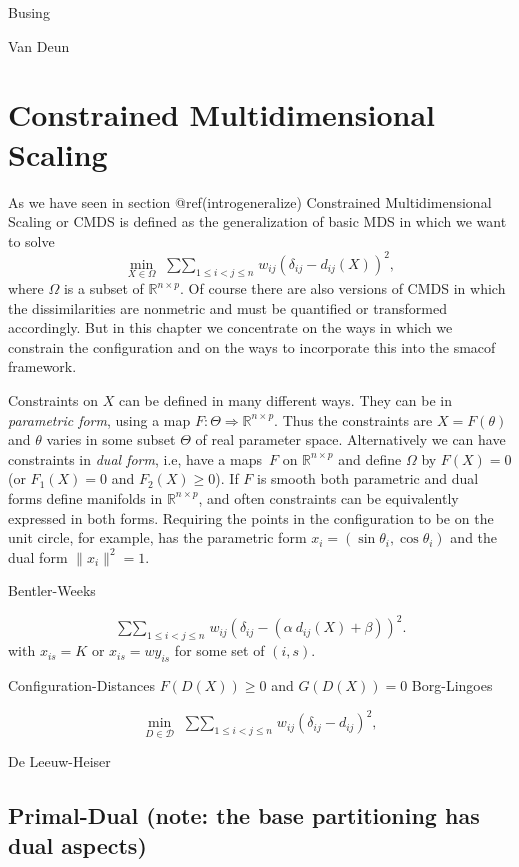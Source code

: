 \documentclass[
  12pt,
  letterpaper,
  DIV=11,
  numbers=noendperiod]{scrreprt}
\theoremstyle{remark}
\begin{document}
Busing

Van Deun


\chapter{Constrained Multidimensional Scaling}\label{cmds}

As we have seen in section @ref(introgeneralize) Constrained
Multidimensional Scaling or CMDS is defined as the generalization of
basic MDS in which we want to solve \[
\min_{X\in\Omega}\ \mathop{\sum\sum}_{1\leq i<j\leq n}w_{ij}(\delta_{ij}-d_{ij}(X))^2,
\] where \(\Omega\) is a subset of \(\mathbb{R}^{n\times p}\). Of course
there are also versions of CMDS in which the dissimilarities are
nonmetric and must be quantified or transformed accordingly. But in this
chapter we concentrate on the ways in which we constrain the
configuration and on the ways to incorporate this into the smacof
framework.

Constraints on \(X\) can be defined in many different ways. They can be
in \emph{parametric form}, using a map
\(F:\Theta\Rightarrow\mathbb{R}^{n\times p}\). Thus the constraints are
\(X=F(\theta)\) and \(\theta\) varies in some subset \(\Theta\) of real
parameter space. Alternatively we can have constraints in \emph{dual
form}, i.e, have a maps~\(F\) on \(\mathbb{R}^{n\times p}\) and define
\(\Omega\) by \(F(X)=0\) (or \(F_1(X)=0\) and \(F_2(X)\geq 0\)). If
\(F\) is smooth both parametric and dual forms define manifolds in
\(\mathbb{R}^{n\times p}\), and often constraints can be equivalently
expressed in both forms. Requiring the points in the configuration to be
on the unit circle, for example, has the parametric form
\(x_i=(\sin\theta_i,\cos\theta_i)\) and the dual form \(\|x_i\|^2=1\).

Bentler-Weeks

\[
\mathop{\sum\sum}_{1\leq i<j\leq n}w_{ij}(\delta_{ij}-(\alpha\  d_{ij}(X)+\beta))^2.
\] with \(x_{is}=K\) or \(x_{is}=wy_{is}\) for some set of \((i,s)\).

Configuration-Distances \(F(D(X))\geq 0\) and \(G(D(X))=0\) Borg-Lingoes

\[
\min_{D\in\mathcal{D}}\ \mathop{\sum\sum}_{1\leq i<j\leq n}w_{ij}(\delta_{ij}-d_{ij})^2,
\]

De Leeuw-Heiser

\section{Primal-Dual (note: the base partitioning has dual
aspects)}\label{primal-dual-note-the-base-partitioning-has-dual-aspects}
\end{document}
